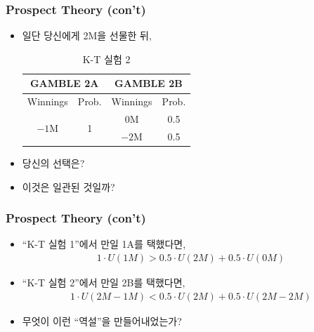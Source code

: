\documentclass[final]{beamer}
\begin{document}
%
\begin{frame}\frametitle{Prospect Theory (con't)}\vspace{1.5em}
%
\begin{itemize}
\item 일단 당신에게 2M을 선물한 뒤, 
\begin{table} 
\setlength{\tabcolsep}{1.2em}
\begin{tabular}{|c|c||c|c|} \hline
\multicolumn{2}{|c||}{GAMBLE 2A}&\multicolumn{2}{c|}{GAMBLE 2B} \\ \hline
Winnings & Prob. & Winnings & Prob. \\ \hline
\multirow{2}[2]{*}{$-1$M} & \multirow{2}[2]{*}{1} & $0$M & 0.5 \\ \cline{3-4}
& & $-2$M & 0.5 \\  \hline
\end{tabular}
\caption{K-T 실험 2}\label{tab:04}
\end{table}
%
\item 당신의 선택은? 
\item 이것은 일관된 것일까? 
\end{itemize}
%
\end{frame}
%
\begin{frame}\frametitle{Prospect Theory (con't)}\vspace{1.5em}
%
\begin{itemize}
\item ``K-T 실험 1''에서 만일 1A를 택했다면, 
%
\begin{align*}
1 \cdot U(1M) > 0.5 \cdot U(2M) + 0.5 \cdot U(0M)
\end{align*}
%
\item ``K-T 실험 2''에서 만일 2B를 택했다면, 
%
\begin{align*}
1 \cdot U(2M-1M) < 0.5 \cdot U(2M) + 0.5 \cdot U(2M-2M)
\end{align*}
%
\item 무엇이 이런 ``역설''을 만들어내었는가? 
\end{itemize}
%
\end{frame}
%
\end{document}
